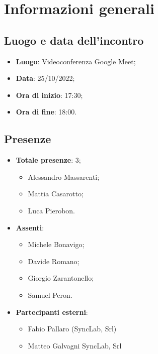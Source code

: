 \section{Informazioni generali}

\subsection{Luogo e data dell'incontro}
\begin{itemize}
    \item \textbf{Luogo}: Videoconferenza Google Meet;
    \item \textbf{Data}: 25/10/2022;
    \item \textbf{Ora di inizio}: 17:30;
    \item \textbf{Ora di fine}: 18:00.
\end{itemize}
\subsection{Presenze}
\begin{itemize}
    \item \textbf{Totale presenze}: 3;
    \begin{itemize}
        \item Alessandro Massarenti;
        \item Mattia Casarotto;
        \item Luca Pierobon.
    \end{itemize}
    \item \textbf{Assenti}:
    \begin{itemize}
        \item Michele Bonavigo;
        \item Davide Romano;
        \item Giorgio Zarantonello;
        \item Samuel Peron.
    \end{itemize}
    \item \textbf{Partecipanti esterni}:
    \begin{itemize}
        \item Fabio Pallaro (SyncLab, Srl)
        \item Matteo Galvagni {SyncLab, Srl}
    \end{itemize}
\end{itemize}
